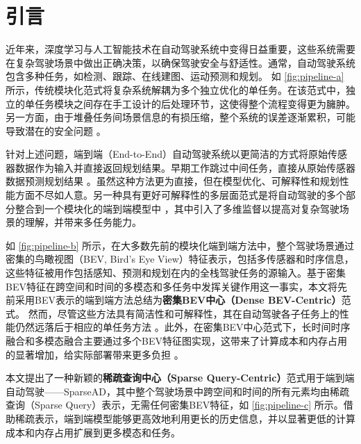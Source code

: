  \section{引言}

近年来，深度学习与人工智能技术在自动驾驶系统中变得日益重要，这些系统需要在复杂驾驶场景中做出正确决策，以确保驾驶安全与舒适性。通常，自动驾驶系统包含多种任务，如检测、跟踪、在线建图、运动预测和规划。
如 \cref{fig:pipeline-a} 所示，传统模块化范式将复杂系统解耦为多个独立优化的单任务。在该范式中，独立的单任务模块之间存在手工设计的后处理环节，这使得整个流程变得更为臃肿。另一方面，由于堆叠任务间场景信息的有损压缩，整个系统的误差逐渐累积，可能导致潜在的安全问题 \cite{liang2020pnpnet, sadat2020perceive}。

针对上述问题，端到端（End-to-End）自动驾驶系统以更简洁的方式将原始传感器数据作为输入并直接返回规划结果。早期工作跳过中间任务，直接从原始传感器数据预测规划结果 \cite{codevilla2018end,codevilla2019exploring, wu2022trajectory, zhang2021end}。虽然这种方法更为直接，但在模型优化、可解释性和规划性能方面不尽如人意。另一种具有更好可解释性的多层面范式是将自动驾驶的多个部分整合到一个模块化的端到端模型中 \cite{hu2023planning, ye2023fusionad}，其中引入了多维监督以提高对复杂驾驶场景的理解，并带来多任务能力。



如 \cref{fig:pipeline-b} 所示，在大多数先前的模块化端到端方法中，整个驾驶场景通过密集的鸟瞰视图（BEV, Bird's Eye View）特征表示，包括多传感器和时序信息，这些特征被用作包括感知、预测和规划在内的全栈驾驶任务的源输入。基于密集BEV特征在跨空间和时间的多模态和多任务中发挥关键作用这一事实，本文将先前采用BEV表示的端到端方法总结为\textbf{密集BEV中心（Dense BEV-Centric）}范式。
然而，尽管这些方法\cite{hu2023planning,ye2023fusionad}具有简洁性和可解释性，其在自动驾驶各子任务上的性能仍然远落后于相应的单任务方法 \cite{liu2022petr, wang2023exploring, pang2023standing, jiang2023vad}。此外，在密集BEV中心范式下，长时间时序融合和多模态融合主要通过多个BEV特征图实现，这带来了计算成本和内存占用的显著增加，给实际部署带来更多负担 \cite{zhang2023fully, jiang2023far3d}。

本文提出了一种新颖的\textbf{稀疏查询中心（Sparse Query-Centric）}范式用于端到端自动驾驶——SparseAD，其中整个驾驶场景中跨空间和时间的所有元素均由稀疏查询（Sparse Query）表示，无需任何密集BEV特征，如 \cref{fig:pipeline-c} 所示。借助稀疏表示，端到端模型能够更高效地利用更长的历史信息，并以显著更低的计算成本和内存占用扩展到更多模态和任务。

